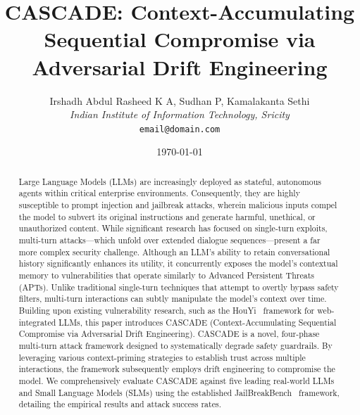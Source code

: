 \documentclass[10pt, a4paper]{article}
\title{CASCADE: Context-Accumulating Sequential Compromise via Adversarial Drift Engineering}
\author{Irshadh Abdul Rasheed K A, Sudhan P, Kamalakanta Sethi\\
\small \textit{Indian Institute of Information Technology, Sricity} \\
\small \texttt{email@domain.com}}
\date{\today}
\begin{document}
\maketitle

\begin{abstract}
Large Language Models (LLMs) are increasingly deployed as stateful, autonomous agents within critical enterprise environments. Consequently, they are highly susceptible to prompt injection and jailbreak attacks, wherein malicious inputs compel the model to subvert its original instructions and generate harmful, unethical, or unauthorized content. While significant research has focused on single-turn exploits, multi-turn attacks---which unfold over extended dialogue sequences---present a far more complex security challenge. Although an LLM’s ability to retain conversational history significantly enhances its utility, it concurrently exposes the model's contextual memory to vulnerabilities that operate similarly to Advanced Persistent Threats (APTs). Unlike traditional single-turn techniques that attempt to overtly bypass safety filters, multi-turn interactions can subtly manipulate the model's context over time. Building upon existing vulnerability research, such as the HouYi~\cite{houyi2023} framework for web-integrated LLMs, this paper introduces CASCADE (Context-Accumulating Sequential Compromise via Adversarial Drift Engineering). CASCADE is a novel, four-phase multi-turn attack framework designed to systematically degrade safety guardrails. By leveraging various context-priming strategies to establish trust across multiple interactions, the framework subsequently employs drift engineering to compromise the model. We comprehensively evaluate CASCADE against five leading real-world LLMs and Small Language Models (SLMs) using the established JailBreakBench~\cite{chao2024jailbreakbench} framework, detailing the empirical results and attack success rates.
\end{abstract}





\maketitle
\end{document}
